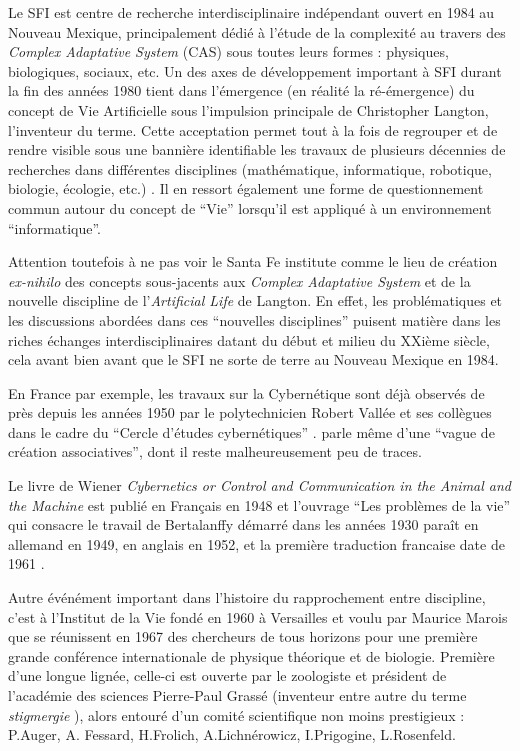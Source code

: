 
Le SFI est centre de recherche interdisciplinaire indépendant ouvert en 1984 au Nouveau Mexique, principalement dédié à l'étude de la complexité au travers des \textit{Complex Adaptative System} (CAS) sous toutes leurs formes : physiques, biologiques, sociaux, etc. Un des axes de développement important à SFI durant la fin des années 1980 tient dans l'émergence (en réalité la ré-émergence) du concept de Vie Artificielle sous l'impulsion principale de Christopher Langton, l'inventeur du terme. Cette acceptation permet tout à la fois de regrouper et de rendre visible sous une bannière identifiable les travaux de plusieurs décennies de recherches dans différentes disciplines (mathématique, informatique, robotique, biologie, écologie, etc.)  \autocite{Taylor1999}. Il en ressort également une forme de questionnement commun autour du concept de \enquote{Vie} lorsqu'il est appliqué à un environnement \enquote{informatique}.

Attention toutefois à ne pas voir le Santa Fe institute comme le lieu de création \textit{ex-nihilo} des concepts sous-jacents aux \textit{Complex Adaptative System} et de la nouvelle discipline de l'\textit{Artificial Life} de Langton. En effet, les problématiques et les discussions abordées dans ces \enquote{nouvelles disciplines} puisent matière dans les riches échanges interdisciplinaires datant du début et milieu du XXième siècle, cela avant bien avant que le SFI ne sorte de terre au Nouveau Mexique en 1984.



En France par exemple, les travaux sur la Cybernétique sont déjà observés de près depuis les années 1950 par le polytechnicien Robert Vallée et ses collègues dans le cadre du \enquote{Cercle d’études cybernétiques} \autocites{Bricage1990,LeRoux2015}. \textcite[404]{Mounier2010} parle même d'une \enquote{vague de création associatives}, dont il reste malheureusement peu de traces.

Le livre de Wiener \textit{Cybernetics or Control and Communication in the Animal and the Machine} est publié en Français en 1948 et l'ouvrage \enquote{Les problèmes de la vie} qui consacre le travail de Bertalanffy démarré dans les années 1930 paraît en allemand en 1949, en anglais en 1952, et la première traduction francaise date de 1961 \autocite{Vallee2005}. 

Autre événément important dans l'histoire du rapprochement entre discipline, c'est à l'Institut de la Vie fondé en 1960 à Versailles et voulu par Maurice Marois \autocites{Marois1969,Marois1971} que se réunissent en 1967 des chercheurs de tous horizons pour une première grande conférence internationale de physique théorique et de biologie. Première d'une longue lignée, celle-ci est ouverte par le zoologiste et président de l'académie des sciences Pierre-Paul Grassé (inventeur entre autre du terme \textit{stigmergie} \autocite{Theraulaz1999}), alors entouré d'un comité scientifique non moins prestigieux : P.Auger, A. Fessard, H.Frolich, A.Lichnérowicz, I.Prigogine, L.Rosenfeld. 

